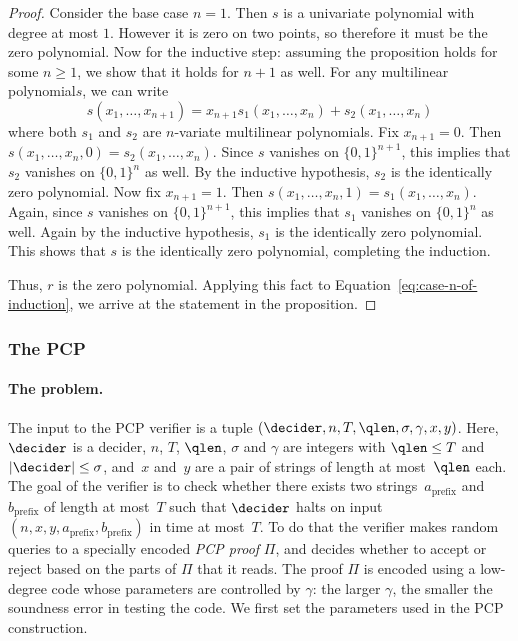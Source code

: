 \begin{proof}
  Consider the base case $n = 1$.
  Then $s$ is a univariate polynomial with degree at most $1$.
  However it is zero on two points, so therefore it must be the zero polynomial.
  Now for the inductive step: assuming the proposition holds for some $n \geq
  1$, we show that it holds for $n+1$ as well.
  For any multilinear polynomial$s$, we can write
	\[
		s(x_1,\ldots,x_{n+1}) = x_{n+1} s_1(x_1,\ldots,x_n) + s_2(x_1,\ldots,x_n)
	\]
	where both $s_1$ and $s_2$ are $n$-variate multilinear polynomials.
  Fix $x_{n+1} = 0$.
  Then $s(x_1,\ldots,x_n,0) = s_2(x_1,\ldots,x_n)$.
  Since $s$ vanishes on $\{0,1\}^{n+1}$, this implies that $s_2$ vanishes on
  $\{0,1\}^n$ as well.
  By the inductive hypothesis, $s_2$ is the identically zero polynomial.
  Now fix $x_{n+1} = 1$.
	Then $s(x_1,\ldots,x_n,1) = s_1(x_1,\ldots,x_n)$.
  Again, since $s$ vanishes on $\{0,1\}^{n+1}$, this implies that $s_1$ vanishes
  on $\{0,1\}^n$ as well.
  Again by the inductive hypothesis, $s_1$ is the identically zero polynomial.
  This shows that $s$ is the identically zero polynomial, completing the
  induction.
  


  Thus, $r$ is the zero polynomial.
  Applying this fact to Equation~\eqref{eq:case-n-of-induction},
  we arrive at the statement in the proposition.
  \end{proof}

\subsubsection{The PCP}
\label{sec:ar-pcp}

\paragraph{The problem.}
The input to the PCP verifier is a tuple $(\decider, n, T, \qlen, \sigma, \gamma,x,
y)$.
Here, $\decider$ is a decider, $n$, $T$, $\qlen$, $\sigma$ and $\gamma$ are integers
with $\qlen \leq T$ and $|\decider| \leq \sigma$, and~$x$ and~$y$ are a pair of
strings of length at most~$\qlen$ each.
The goal of the verifier is to check whether there exists two
strings~$a_{\mathrm{prefix}}$ and~$b_{\mathrm{prefix}}$ of length at most~$T$ 
such that $\decider$ halts on input
$(n,x,y,a_{\mathrm{prefix}},b_{\mathrm{prefix}})$ in time at most~$T$.
To do that the verifier makes random queries to a specially encoded \emph{PCP
  proof} $\Pi$, and decides whether to accept or reject based on the parts of
$\Pi$ that it reads. The proof $\Pi$ is encoded using a low-degree
code whose parameters are controlled by $\gamma$: the larger $\gamma$,
the smaller the soundness error in testing the code.
We first set the parameters used in the PCP construction.


